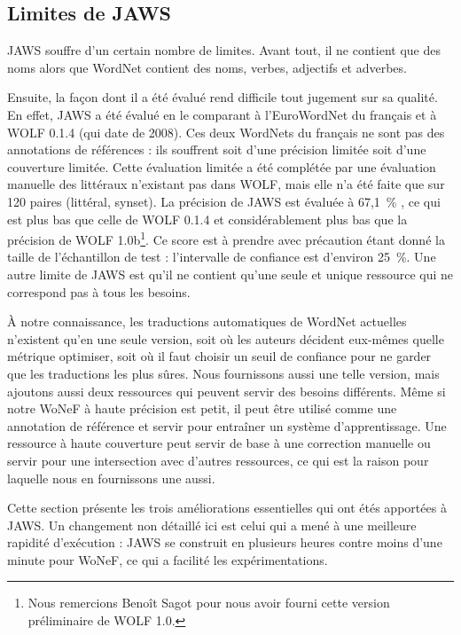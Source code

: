 \subsection{Limites de JAWS}
\label{subsec:limitations}

JAWS souffre d'un certain nombre de limites. Avant tout, il ne contient que des
noms alors que WordNet contient des noms, verbes, adjectifs et adverbes.

Ensuite, la façon dont il a été évalué rend difficile tout jugement sur sa
qualité. En effet, JAWS a été évalué en le comparant à l'EuroWordNet du
français et à WOLF 0.1.4 (qui date de 2008). Ces deux WordNets du français ne
sont pas des annotations de références : ils souffrent soit d'une précision
limitée soit d'une couverture limitée. Cette évaluation limitée a été complétée
par une évaluation manuelle des littéraux n'existant pas dans WOLF, mais elle
n'a été faite que sur 120 paires (littéral, synset). La précision de JAWS est
évaluée à 67,1~\% \citep{mouton2010phd}, ce qui est plus bas que celle de WOLF
0.1.4 et considérablement plus bas que la précision de WOLF 1.0b\footnote{Nous
remercions Benoît Sagot pour nous avoir fourni cette version préliminaire de
WOLF 1.0.}. Ce score est à prendre avec précaution étant donné la taille de
l'échantillon de test : l'intervalle de confiance est d'environ 25~\%. Une
autre limite de JAWS est qu'il ne contient qu'une seule et unique ressource qui
ne correspond pas à tous les besoins.


À notre connaissance, les traductions automatiques de WordNet actuelles
n'existent qu'en une seule version, soit où les auteurs décident eux-mêmes
quelle métrique optimiser, soit où il faut choisir un seuil de confiance pour
ne garder que les traductions les plus sûres. Nous fournissons aussi une telle
version, mais ajoutons aussi deux ressources qui peuvent servir des besoins
différents. Même si notre WoNeF à haute précision est petit, il peut être
utilisé comme une annotation de référence et servir pour entraîner un système
d'apprentissage. Une ressource à haute couverture peut servir de base à une
correction manuelle ou servir pour une intersection avec d'autres ressources,
ce qui est la raison pour laquelle nous en fournissons une aussi.


Cette section présente les trois améliorations essentielles qui ont étés
apportées à JAWS. Un changement non détaillé ici est celui qui a mené à une
meilleure rapidité d'exécution : JAWS se construit en plusieurs heures contre
moins d'une minute pour WoNeF, ce qui a facilité les expérimentations.

